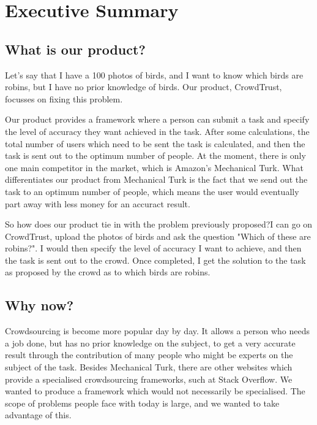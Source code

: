 \documentclass[11pt]{article}
\begin{document}
\newpage

\tableofcontents	%

\newpage


\section{Executive Summary}

\subsection{What is our product?}
Let's say that I have a 100 photos of birds, and I want to know which birds are 
robins, but I have no prior knowledge of birds. Our product, CrowdTrust, focusses
on fixing this problem.

Our product provides a framework where a person can submit a task and specify
the level of accuracy they want achieved in the task. After some calculations,
the total number of users which need to be sent the task is calculated, and
then the task is sent out to the optimum number of people. At the moment,
there is only one main competitor in the market, which is Amazon's Mechanical
Turk. What differentiates our product from Mechanical Turk is the fact that
we send out the task to an optimum number of people, which means the user
would eventually part away with less money for an accuract result.

So how does our product tie in with the problem previously proposed?I can go on 
CrowdTrust, upload the photos of birds and ask the question "Which of these are 
robins?". I would then specify the level of accuracy I want to achieve, and then 
the task is sent out to the crowd. Once completed, I get the solution to the 
task as proposed by the crowd as to which birds are robins.

\subsection{Why now?}
Crowdsourcing is become more popular day by day. It allows a person who needs
a job done, but has no prior knowledge on the subject, to get a very accurate
result through the contribution of many people who might be experts on the
subject of the task. Besides Mechanical Turk, there are other websites which
provide a specialised crowdsourcing frameworks, such at Stack Overflow. We wanted
to produce a framework which would not necessarily be specialised. The scope of
problems people face with today is large, and we wanted to take advantage of this.
\end{document}
